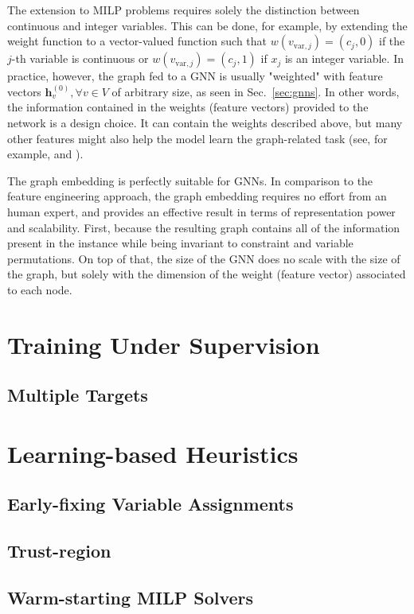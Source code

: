 The extension to MILP problems requires solely the distinction between continuous and integer variables.
This can be done, for example, by extending the weight function to a vector-valued function such that $w(v_{\textrm{var},j}) = (c_j,0)$ if the $j$-th variable is continuous or $w(v_{\textrm{var},j}) = (c_j,1)$ if $x_j$ is an integer variable.
In practice, however, the graph fed to a GNN is usually "weighted" with feature vectors $\bm{h}_v^{(0)}, \forall v\in V$ of arbitrary size, as seen in Sec.~\ref{sec:gnns}.
In other words, the information contained in the weights (feature vectors) provided to the network is a design choice.
It can contain the weights described above, but many other features might also help the model learn the graph-related task (see, for example,  and ).

The graph embedding is perfectly suitable for GNNs.
In comparison to the feature engineering approach, the graph embedding requires no effort from an human expert, and provides an effective result in terms of representation power and scalability.
First, because the resulting graph contains all of the information present in the instance while being invariant to constraint and variable permutations.
On top of that, the size of the GNN does no scale with the size of the graph, but solely with the dimension of the weight (feature vector) associated to each node.


\section{Training Under Supervision}

\subsection{Multiple Targets}

\section{Learning-based Heuristics}\label{sec:learning-based-heuristics}

\subsection{Early-fixing Variable Assignments}

\subsection{Trust-region}

\subsection{Warm-starting MILP Solvers}

